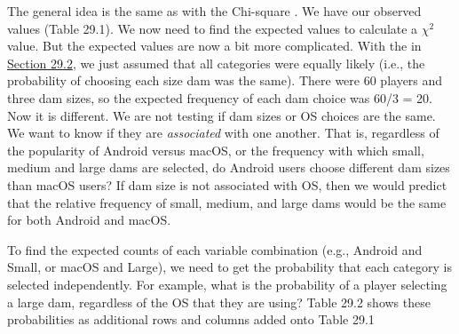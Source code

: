 \documentclass[
  openany]{krantz}
\begin{document}
The general idea is the same as with the Chi-square .
We have our observed values (Table 29.1).
We now need to find the expected values to calculate a \(\chi^{2}\) value.
But the expected values are now a bit more complicated.
With the  in \protect\hyperlink{chi-squared-goodness-of-fit}{Section 29.2}, we just assumed that all categories were equally likely (i.e., the probability of choosing each size dam was the same).
There were 60 players and three dam sizes, so the expected frequency of each dam choice was 60/3 = 20.
Now it is different.
We are not testing if dam sizes or OS choices are the same.
We want to know if they are \emph{associated} with one another.
That is, regardless of the popularity of Android versus macOS, or the frequency with which small, medium and large dams are selected, do Android users choose different dam sizes than macOS users?
If dam size is not associated with OS, then we would predict that the relative frequency of small, medium, and large dams would be the same for both Android and macOS.

To find the expected counts of each variable combination (e.g., Android and Small, or macOS and Large), we need to get the probability that each category is selected independently.
For example, what is the probability of a player selecting a large dam, regardless of the OS that they are using?
Table 29.2 shows these probabilities as additional rows and columns added onto Table 29.1
\end{document}
